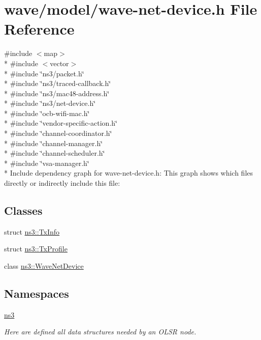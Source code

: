 \hypertarget{wave-net-device_8h}{}\section{wave/model/wave-\/net-\/device.h File Reference}
\label{wave-net-device_8h}
{\ttfamily \#include $<$map$>$}\\*
{\ttfamily \#include $<$vector$>$}\\*
{\ttfamily \#include \char`\"{}ns3/packet.\+h\char`\"{}}\\*
{\ttfamily \#include \char`\"{}ns3/traced-\/callback.\+h\char`\"{}}\\*
{\ttfamily \#include \char`\"{}ns3/mac48-\/address.\+h\char`\"{}}\\*
{\ttfamily \#include \char`\"{}ns3/net-\/device.\+h\char`\"{}}\\*
{\ttfamily \#include \char`\"{}ocb-\/wifi-\/mac.\+h\char`\"{}}\\*
{\ttfamily \#include \char`\"{}vendor-\/specific-\/action.\+h\char`\"{}}\\*
{\ttfamily \#include \char`\"{}channel-\/coordinator.\+h\char`\"{}}\\*
{\ttfamily \#include \char`\"{}channel-\/manager.\+h\char`\"{}}\\*
{\ttfamily \#include \char`\"{}channel-\/scheduler.\+h\char`\"{}}\\*
{\ttfamily \#include \char`\"{}vsa-\/manager.\+h\char`\"{}}\\*
Include dependency graph for wave-\/net-\/device.h\+:
This graph shows which files directly or indirectly include this file\+:
\subsection*{Classes}
\begin{DoxyCompactItemize}
\item 
struct \hyperlink{structns3_1_1TxInfo}{ns3\+::\+Tx\+Info}
\item 
struct \hyperlink{structns3_1_1TxProfile}{ns3\+::\+Tx\+Profile}
\item 
class \hyperlink{classns3_1_1WaveNetDevice}{ns3\+::\+Wave\+Net\+Device}
\end{DoxyCompactItemize}
\subsection*{Namespaces}
\begin{DoxyCompactItemize}
\item 
 \hyperlink{namespacens3}{ns3}
\begin{DoxyCompactList}\small\item\em Here are defined all data structures needed by an O\+L\+SR node. \end{DoxyCompactList}\end{DoxyCompactItemize}
